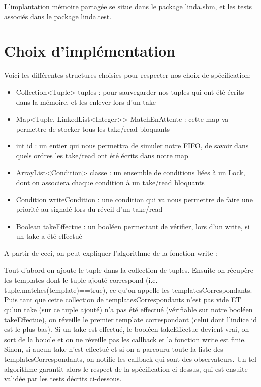 \documentclass{report}
\begin{document}
L'implantation mémoire partagée se situe dans le package linda.shm, et les tests associés dans le package linda.test.

\section{Choix d'implémentation}

Voici les différentes structures choisies pour respecter nos choix de spécification:
\begin{itemize}
 \item Collection<Tuple> tuples : pour sauvegarder nos tuples qui ont été écrits dans la mémoire, et les enlever lors d'un take
 \item	Map<Tuple, LinkedList<Integer>> MatchEnAttente : cette map va permettre de stocker tous les take/read bloquants 
 \item int id : un entier qui nous permettra de simuler notre FIFO, de savoir dans quels ordres les take/read ont été écrits dans notre map
 \item ArrayList<Condition> classe : un ensemble de conditions liées à un Lock, dont on associera chaque condition à un take/read bloquants
 \item Condition writeCondition : une condition qui va nous permettre de faire une priorité au signalé lors du réveil d'un take/read
 \item Boolean takeEffectue : un booléen permettant de vérifier, lors d'un write, si un take a été effectué
\end{itemize}


A partir de ceci, on peut expliquer l'algorithme de la fonction write :

Tout d'abord on ajoute le tuple dans la collection de tuples. Ensuite on récupère les templates dont le tuple ajouté correspond (i.e. tuple.matches(template)==true), ce qu'on appelle
les templatesCorrespondants. Puis tant que cette collection de templatesCorrespondants n'est pas vide ET qu'un take (sur ce tuple ajouté) n'a pas
été effectué (vérifiable sur notre booléen takeEffectue), on réveille le premier template correspondant (celui dont l'indice id est le plus bas).
Si un take est effectué, le booléen takeEffectue devient vrai, on sort de la boucle et on ne réveille pas les callback et la fonction write est finie.
Sinon, si aucun take n'est effectué et si on a parcouru toute la liste des templatesCorrespondants, on notifie les callback qui sont des observateurs.
Un tel algorithme garantit alors le respect de la spécification ci-dessus, qui est ensuite validée par les tests décrits ci-dessous.
\end{document}
